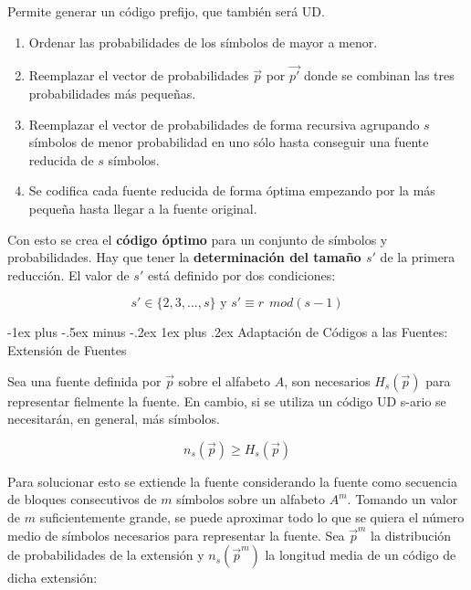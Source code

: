 \documentclass[10pt,landscape]{article}
\makeatletter
\renewcommand{\subsubsection}{\@startsection{subsubsection}{3}{0mm}%
                                {-1ex plus -.5ex minus -.2ex}%
                                {1ex plus .2ex}%
                                {\normalfont\small\bfseries}}
\makeatother
\begin{document}
\begin{multicols}{3}
Permite generar un código prefijo, que también será UD. 

\begin{enumerate}
	\item Ordenar las probabilidades de los símbolos de mayor a menor.
	\item Reemplazar el vector de probabilidades $\vec{p}$ por $\vec{p'}$ donde se combinan las tres probabilidades más pequeñas.
	\item Reemplazar el vector de probabilidades de forma recursiva agrupando $s$ símbolos de menor probabilidad en uno sólo hasta conseguir una fuente reducida de $s$ símbolos.
	\item Se codifica cada fuente reducida de forma óptima empezando por la más pequeña hasta llegar a la fuente original.
\end{enumerate}

Con esto se crea el \textbf{código óptimo} para un conjunto de símbolos y probabilidades. Hay que tener la \textbf{determinación del tamaño $s'$} de la primera reducción. El valor de $s'$ está definido por dos condiciones:

\begin{equation*}
	s' \in \{2, 3, ..., s \} \mbox{ y } s' \equiv r \hspace{5pt} mod (s-1)
\end{equation*}

\subsubsection{Adaptación de Códigos a las Fuentes: Extensión de Fuentes}

Sea una fuente definida por $\vec{p}$ sobre el alfabeto $A$, son necesarios $H_s(\vec{p})$ para representar fielmente la fuente. En cambio, si se utiliza un código UD s-ario se necesitarán, en general, más símbolos.

\begin{equation*}
	n_s(\vec{p}) \geq H_s(\vec{p})
\end{equation*}

Para solucionar esto se extiende la fuente considerando la fuente como secuencia de bloques consecutivos de $m$ símbolos sobre un alfabeto $A^m$. Tomando un valor de $m$ suficientemente grande, se puede aproximar todo lo que se quiera el número medio de símbolos necesarios para representar la fuente. Sea $\vec{p}^m$ la distribución de probabilidades de la extensión y $n_s(\vec{p}^m)$ la longitud media de un código de dicha extensión:


\end{multicols}
\end{document}
